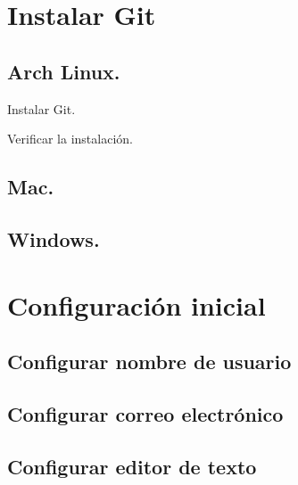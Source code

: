 \section{Instalar Git}
\subsection{Arch Linux.}


Instalar Git.


Verificar la instalación.


\subsection{Mac.}

\subsection{Windows.}


\section{Configuración inicial}
\subsection{Configurar nombre de usuario}

\subsection{Configurar correo electrónico}

\subsection{Configurar editor de texto}

